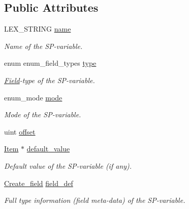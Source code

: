 \subsection*{Public Attributes}
\begin{DoxyCompactItemize}
\item 
\mbox{\label{classsp__variable_a522cdeb2e86b5ef2b9078091e8f3c715}} 
L\+E\+X\+\_\+\+S\+T\+R\+I\+NG \mbox{\hyperlink{classsp__variable_a522cdeb2e86b5ef2b9078091e8f3c715}{name}}
\begin{DoxyCompactList}\small\item\em Name of the SP-\/variable. \end{DoxyCompactList}\item 
\mbox{\label{classsp__variable_ac552ce28eddbf5617939c3e6c2953dc2}} 
enum enum\+\_\+field\+\_\+types \mbox{\hyperlink{classsp__variable_ac552ce28eddbf5617939c3e6c2953dc2}{type}}
\begin{DoxyCompactList}\small\item\em \mbox{\hyperlink{classField}{Field}}-\/type of the SP-\/variable. \end{DoxyCompactList}\item 
\mbox{\label{classsp__variable_a4b636c011ffece730d6b3205f92e88e2}} 
enum\+\_\+mode \mbox{\hyperlink{classsp__variable_a4b636c011ffece730d6b3205f92e88e2}{mode}}
\begin{DoxyCompactList}\small\item\em Mode of the SP-\/variable. \end{DoxyCompactList}\item 
uint \mbox{\hyperlink{classsp__variable_ab053166f9aaf72e5bfb2eb5df27672df}{offset}}
\item 
\mbox{\label{classsp__variable_a23ef964d98a25acbeb927ace417bad1c}} 
\mbox{\hyperlink{classItem}{Item}} $\ast$ \mbox{\hyperlink{classsp__variable_a23ef964d98a25acbeb927ace417bad1c}{default\+\_\+value}}
\begin{DoxyCompactList}\small\item\em Default value of the SP-\/variable (if any). \end{DoxyCompactList}\item 
\mbox{\label{classsp__variable_a73f9f6e62ce471fdac83ca6f976d7b80}} 
\mbox{\hyperlink{classCreate__field}{Create\+\_\+field}} \mbox{\hyperlink{classsp__variable_a73f9f6e62ce471fdac83ca6f976d7b80}{field\+\_\+def}}
\begin{DoxyCompactList}\small\item\em Full type information (field meta-\/data) of the SP-\/variable. \end{DoxyCompactList}\end{DoxyCompactItemize}
